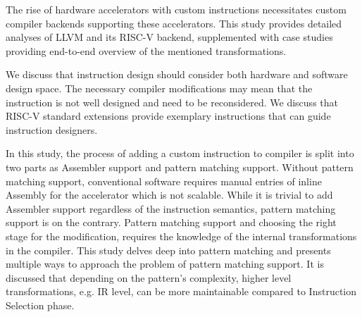 
The rise of hardware accelerators with custom instructions necessitates custom compiler backends supporting these accelerators. This study provides detailed analyses of LLVM and its RISC-V backend, supplemented with case studies providing end-to-end overview of the mentioned transformations. 

We discuss that instruction design should consider both hardware and software design space. The necessary compiler modifications may mean that the instruction is not well designed and need to be reconsidered. We discuss that RISC-V standard extensions provide exemplary instructions that can guide instruction designers.

In this study, the process of adding a custom instruction to compiler is split into two parts as Assembler support and pattern matching support. Without pattern matching support, conventional software requires manual entries of inline Assembly for the accelerator which is not scalable. While it is trivial to add Assembler support regardless of the instruction semantics, pattern matching support is on the contrary. Pattern matching support and choosing the right stage for the modification, requires the knowledge of the internal transformations in the compiler. This study delves deep into pattern matching and presents multiple ways to approach the problem of pattern matching support. It is discussed that depending on the pattern's complexity, higher level transformations, e.g. IR level, can be more maintainable compared to Instruction Selection phase. 







